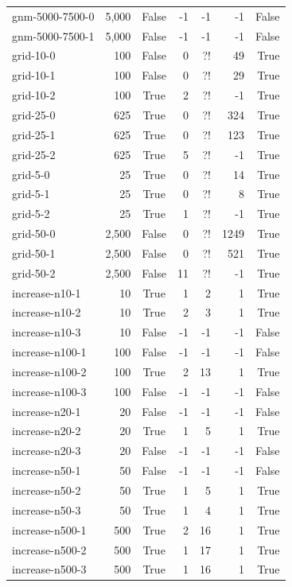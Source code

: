 \begin{table}[ht]
\begin{tabular}{l r c r r r r}
gnm-5000-7500-0 & 5,000 & False & -1 & -1 & -1 & False \\
gnm-5000-7500-1 & 5,000 & False & -1 & -1 & -1 & False \\
grid-10-0 & 100 & False & 0 & ?! & 49 & True \\
grid-10-1 & 100 & False & 0 & ?! & 29 & True \\
grid-10-2 & 100 & True & 2 & ?! & -1 & True \\
grid-25-0 & 625 & True & 0 & ?! & 324 & True \\
grid-25-1 & 625 & True & 0 & ?! & 123 & True \\
grid-25-2 & 625 & True & 5 & ?! & -1 & True \\
grid-5-0 & 25 & True & 0 & ?! & 14 & True \\
grid-5-1 & 25 & True & 0 & ?! & 8 & True \\
grid-5-2 & 25 & True & 1 & ?! & -1 & True \\
grid-50-0 & 2,500 & False & 0 & ?! & 1249 & True \\
grid-50-1 & 2,500 & False & 0 & ?! & 521 & True \\
grid-50-2 & 2,500 & False & 11 & ?! & -1 & True \\
increase-n10-1 & 10 & True & 1 & 2 & 1 & True \\
increase-n10-2 & 10 & True & 2 & 3 & 1 & True \\
increase-n10-3 & 10 & False & -1 & -1 & -1 & False \\
increase-n100-1 & 100 & False & -1 & -1 & -1 & False \\
increase-n100-2 & 100 & True & 2 & 13 & 1 & True \\
increase-n100-3 & 100 & False & -1 & -1 & -1 & False \\
increase-n20-1 & 20 & False & -1 & -1 & -1 & False \\
increase-n20-2 & 20 & True & 1 & 5 & 1 & True \\
increase-n20-3 & 20 & False & -1 & -1 & -1 & False \\
increase-n50-1 & 50 & False & -1 & -1 & -1 & False \\
increase-n50-2 & 50 & True & 1 & 5 & 1 & True \\
increase-n50-3 & 50 & True & 1 & 4 & 1 & True \\
increase-n500-1 & 500 & True & 2 & 16 & 1 & True \\
increase-n500-2 & 500 & True & 1 & 17 & 1 & True \\
increase-n500-3 & 500 & True & 1 & 16 & 1 & True \\

\end{tabular}
\end{table}
